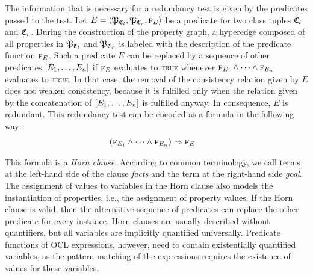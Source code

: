 The information that is necessary for a redundancy test is given by the predicates passed to the test.
Let $E = \tupled{\propertysettuple{P}{\classtuple{C}{l}}, \propertysettuple{P}{\classtuple{C}{r}}, \function{f}_E}$ be a predicate for two class tuples $\classtuple{C}{l}$ and $\classtuple{C}{r}$. 
During the construction of the property graph, a hyperedge composed of all properties in $\propertysettuple{P}{\classtuple{C}{l}}$ and $\propertysettuple{P}{\classtuple{C}{r}}$ is labeled with the description of the predicate function $\textsc{f}_E$.
Such a predicate $E$ can be replaced by a sequence of other predicates $[E_1, \dots, E_n]$ if $\textsc{f}_E$ evaluates to \textsc{true} whenever $\textsc{f}_{E_1} \wedge \dots \wedge \textsc{f}_{E_n}$ evaluates to \textsc{true}.
In that case, the removal of the consistency relation given by $E$ does not weaken consistency, because it is fulfilled only when  the relation given by the concatenation of $[E_1, \dots, E_n]$ is fulfilled anyway.
In consequence, $E$ is redundant.
This redundancy test can be encoded as a formula in the following way:
\begin{align*}
    &
    (\textsc{f}_{E_1} \wedge \dots \wedge \textsc{f}_{E_n}) \Rightarrow \textsc{f}_{E}
\end{align*}

This formula is a \emph{Horn clause}.
According to common terminology, we call terms at the left-hand side of the clause \emph{facts} and the term at the right-hand side \emph{goal}.
The assignment of values to variables in the Horn clause also models the instantiation of properties, i.e., the assignment of property values.
If the Horn clause is valid, then the alternative sequence of predicates can replace the other predicate for every instance.
Horn clauses are usually described without quantifiers, but all variables are implicitly quantified universally.
Predicate functions of \gls{OCL} expressions, however, need to contain existentially quantified \qvtr variables, as the pattern matching of the expressions requires the existence of values for these variables.



